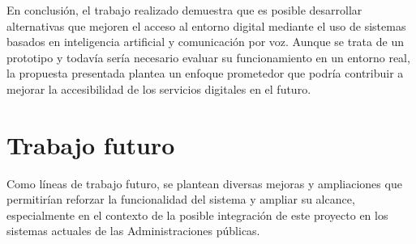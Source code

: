     En conclusión, el trabajo realizado demuestra que es posible desarrollar alternativas que mejoren el acceso al entorno digital mediante el uso de sistemas basados en inteligencia artificial y comunicación por voz. 
    Aunque se trata de un prototipo y todavía sería necesario evaluar su funcionamiento en un entorno real, la propuesta presentada plantea un enfoque prometedor que podría contribuir a mejorar la accesibilidad de los servicios digitales en el futuro. 
    
\section{Trabajo futuro}

    Como líneas de trabajo futuro, se plantean diversas mejoras y ampliaciones que permitirían reforzar la funcionalidad del sistema y ampliar su alcance, especialmente en el contexto de la posible integración de este proyecto en los sistemas actuales de las Administraciones públicas.

